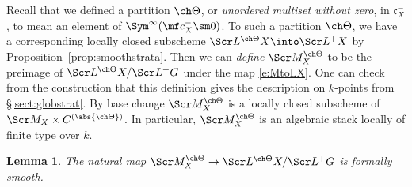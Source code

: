 \documentclass[final]{amsart}
\newtheorem{lem}[subsubsection]{Lemma}
\theoremstyle{remark}
\theoremstyle{definition}
\numberwithin{equation}{section}
\begin{document}
Recall that we defined a partition $\ch\Theta$, or \emph{unordered multiset without zero}, in $\mathfrak c_X^-$, 
to mean an element of $\Sym^\infty(\mf c_X^- \sm 0)$. 
To such a partition $\ch\Theta$, we have a corresponding 
locally closed subscheme $\Scr L^{\ch\Theta} X \into \Scr L^+ X$
by Proposition~\ref{prop:smoothstrata}. 
Then we can \emph{define} $\Scr M^{\ch\Theta}_X$ 
to be the preimage of $\Scr L^{\ch\Theta} X / \Scr L^+G$ under the map 
\eqref{e:MtoLX}. 
One can check from the construction that 
this definition gives the description on $k$-points 
from \S\ref{sect:globstrat}.
By base change $\Scr M^{\ch\Theta}_X$ is a locally closed
subscheme of $\Scr M_X \times C^{(\abs{\ch\Theta})}$. 
In particular, $\Scr M^{\ch\Theta}_X$ is an algebraic 
stack locally of finite type over $k$. 

\begin{lem} \label{lem:MtoLsm}
The natural map $\Scr M^{\ch\Theta}_X \to \Scr L^{\ch\Theta} X / \Scr L^+G$ is formally 
smooth. 
\end{lem}
\end{document}
